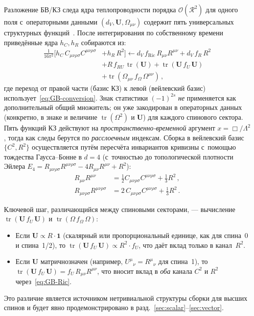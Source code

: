 \documentclass[aps,prd,twocolumn,superscriptaddress,nofootinbib,floatfix]{revtex4-2}
\theoremstyle{definition}
\theoremstyle{remark}
\newcommand{\Weylsq}{C_{\mu\nu\rho\sigma}C^{\mu\nu\rho\sigma}}
\newcommand{\Ricsq}{R_{\mu\nu}R^{\mu\nu}}
\newcommand{\Riemsq}{R_{\mu\nu\rho\sigma}R^{\mu\nu\rho\sigma}}
\newcommand{\tr}{\operatorname{tr}}
\begin{document}
Разложение БВ/КЗ следа ядра теплопроводности порядка
$\mathcal{O}(\mathcal{R}^2)$ для одного поля с~операторными данными
$(d_V, \mathbf{U}, \Omega_{\mu\nu})$ содержит пять универсальных
структурных функций~\cite{Barvinsky:1987uw,Codello:2012kq}. После
интегрирования по собственному времени приведённые ядра $h_C, h_R$
собираются из:
\begin{align}
  \frac{1}{16\pi^2}\bigl[h_C\,\Weylsq &+ h_R\,R^2\bigr]
  \longleftarrow
  d_V\,f_{\text{Ric}}\,\Ricsq
  + d_V\,f_R\,R^2  \nonumber\\
  &+ R\,f_{RU}\,\tr(\mathbf{U})
  + \tr(\mathbf{U}\,f_U\,\mathbf{U})  \nonumber\\
  &+ \tr(\Omega_{\mu\nu}\,f_\Omega\,\Omega^{\mu\nu})\,,
  \label{eq:CZ-expansion}
\end{align}
где переход от правой части (базис КЗ) к левой (вейлевский базис)
использует~\eqref{eq:GB-conversion}. Знак статистики $(-1)^{2s}$
\emph{не} применяется как дополнительный общий множитель; он уже закодирован
в операторных данных (конкретно, в знаке и величине $\tr(\Omega^2)$ и
$\mathbf{U}$) для каждого спинового сектора.
Пять функций КЗ действуют на \emph{пространственно-временной} аргумент
$x = \Box/\Lambda^2$, тогда как следы берутся по \emph{расслоечным}
индексам. Сборка в вейлевский базис $\{C^2, R^2\}$ осуществляется путём
пересчёта инвариантов кривизны с~помощью тождества Гаусса--Бонне в $d = 4$
(с~точностью до топологической плотности Эйлера
$E_4 = \Riemsq - 4\Ricsq + R^2$):
\begin{subequations}
\label{eq:GB-conversion}
\begin{align}
  \Ricsq &= \tfrac{1}{2}\Weylsq + \tfrac{1}{3}R^2\,,
  \label{eq:GB-Ric}\\
  \Riemsq &= 2\,\Weylsq + \tfrac{1}{3}R^2\,.
  \label{eq:GB-Riem}
\end{align}
\end{subequations}

Ключевой шаг, различающийся между спиновыми секторами, --- вычисление
$\tr(\mathbf{U}\,f_U\,\mathbf{U})$ и
$\tr(\Omega\,f_\Omega\,\Omega)$:
\begin{itemize}
\item Если $\mathbf{U} \propto R\cdot\mathbf{1}$ (скалярный или
  пропорциональный единице, как для спина~0 и спина~1/2), то
  $\tr(\mathbf{U}\,f_U\,\mathbf{U}) \propto R^2 \cdot f_U$, что даёт
  вклад только в канал~$R^2$.
\item Если $\mathbf{U}$ матричнозначен (например,
  $U^\mu{}_\nu = R^\mu{}_\nu$ для спина~1), то
  $\tr(\mathbf{U}\,f_U\,\mathbf{U}) = f_U\,\Ricsq$, что вносит вклад
  в \emph{оба} канала $C^2$ и $R^2$ через~\eqref{eq:GB-Ric}.
\end{itemize}
Это различие является источником нетривиальной структуры сборки для
высших спинов и будет явно продемонстрировано в
разд.~\ref{sec:scalar}--\ref{sec:vector}.
\end{document}
